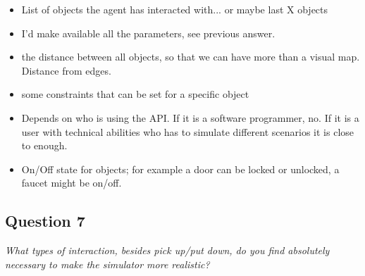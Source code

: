 \begin{itemize}
	\item List of objects the agent has interacted with... or maybe last X objects
	\item I'd make available all the parameters, see previous answer.
	\item the distance between all objects, so that we can have more than a visual map. Distance from edges.
	\item some constraints that can be set for a specific object
	\item Depends on who is using the API. If it is a software programmer, no. If it is a user with technical abilities who has to simulate different scenarios it is close to enough.
	\item On/Off state for objects; for example a door can be locked or unlocked, a faucet might be on/off. 
\end{itemize}

\subsection{Question 7}\label{question2:7}
\emph{What types of interaction, besides pick up/put down, do you find absolutely necessary to make the simulator more realistic?}

